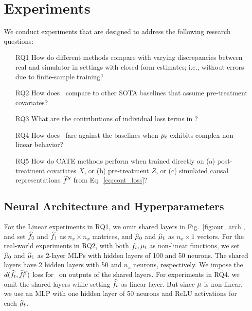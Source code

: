 \section{Experiments}
\label{sec:expts}
We conduct experiments that are designed to address the following research questions:
\begin{itemize}[leftmargin=0.8cm, itemsep=0pt]
    \item[RQ1] How do different methods compare with varying discrepancies between real and simulator in settings with closed form estimates; i.e., without errors due to finite-sample training? 
    \item[RQ2] How does \our\ compare to other SOTA baselines that assume pre-treatment covariates?
    \item[RQ3] What are the contributions of individual loss terms in \our?
    \item[RQ4] How does \our\ fare against the baselines when $\mu_t$ exhibits complex non-linear behavior?
    \item[RQ5] How do CATE methods perform when trained directly on (a) post-treatment covariates $X$, or (b) pre-treatment $Z$, or (c) simulated causal representations $\widetilde{f}^S$ from Eq.~\ref{eq:cont_loss}?
\end{itemize}


\subsection{Neural Architecture and Hyperparameters} \label{app:model_arch}
For the Linear experiments in RQ1, we omit shared layers in Fig.~\ref{fig:our_arch}, 
and set $\widehat{f}_0$ and $\widehat{f}_1$ as ${n_x} \times {n_x}$ matrices, and $\widehat{\mu}_0$ and $\widehat{\mu}_1$ as ${n_x} \times 1$ vectors. 
% 
% 
For the real-world experiments in RQ2, with both $f_t, \mu_t$ as non-linear functions, we set $\widehat{\mu}_0$ and $\widehat{\mu}_1$ as 2-layer MLPs with hidden layers of 100 and 50 neurons.
The shared layers have 2 hidden layers with 50 and ${n_x}$ neurons, respectively. We impose the $d(\widehat{f}_t, \widetilde{f}^S_t)$ loss for \our\ on outputs of the shared layers. 
For experiments in RQ4, we omit the shared layers while setting $\widehat{f}_t$ as linear layer. But since $\mu$ is non-linear, we use an MLP with one hidden layer of 50 neurons and ReLU activations for each $\widehat{\mu}_t$.



